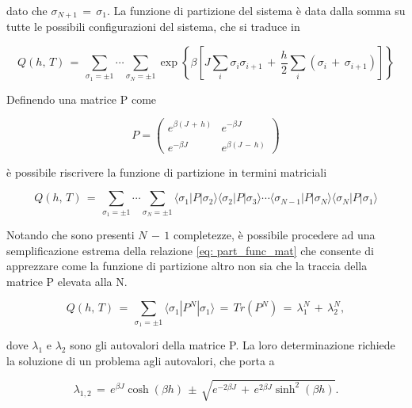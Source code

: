 dato che $\sigma_{N+1}\,=\,\sigma_1$. La funzione di partizione del sistema è data dalla somma su tutte le possibili 
configurazioni del sistema, che si traduce in 

\begin{equation}
    Q\left(h,\,T\right)\,=\,\sum_{\sigma_1=\pm 1} \cdots \sum_{\sigma_N=\pm 1} \exp{\left\{\beta\left[J\sum_i \sigma_i \sigma_{i+1}\,+\,\frac{h}{2}\sum_i \left(\sigma_i\,+\,\sigma_{i+1}\right)\right]\right\}}
    \label{eq: part_func}
\end{equation}

Definendo una matrice P come

\begin{equation}
    P = \begin{pmatrix}
    e^{\beta\left(J\,+\,h\right)} & e^{-\beta J} \\\\
    e^{-\beta J} & e^{\beta\left(J\,-\,h\right)}
    \end{pmatrix}
    \label{eq: mat_P}
\end{equation}

è possibile riscrivere la funzione di partizione in termini matriciali

\begin{equation}
    Q\left(h,\,T\right)\,=\,\sum_{\sigma_1=\pm 1} \cdots \sum_{\sigma_N=\pm 1} \langle \sigma_1 | P | \sigma_2 \rangle \langle \sigma_2 | P | \sigma_3 \rangle \cdots \langle \sigma_{N-1} | P | \sigma_N \rangle \langle \sigma_N | P | \sigma_1 \rangle 
    \label{eq: part_func_mat}
\end{equation}

Notando che sono presenti $N\,-\,1$ completezze, è possibile procedere ad una semplificazione estrema della relazione 
\eqref{eq: part_func_mat} che consente di apprezzare come la funzione di partizione altro non sia che la traccia della matrice P 
elevata alla N. 

\begin{equation}
    Q\left(h,\,T\right)\,=\,\sum_{\sigma_1=\pm 1} \langle \sigma_1 | P^N | \sigma_1 \rangle \,=\,Tr\left(P^N\right)\,=\,\lambda_1^N\,+\,\lambda_2^N,
    \label{eq: part_func_simp}
\end{equation}

dove $\lambda_1$ e $\lambda_2$ sono gli autovalori della matrice P. La loro determinazione richiede la soluzione di un problema agli 
autovalori, che porta a 

\begin{equation}
    \lambda_{1,2}\,=\,e^{\beta J} \cosh{\left(\beta h\right)}\,\pm\,\sqrt{e^{- 2 \beta J}\,+\,e^{2 \beta J} \sinh^2{\left(\beta h\right)}}.
    \label{eq: autoval_P}
\end{equation}

